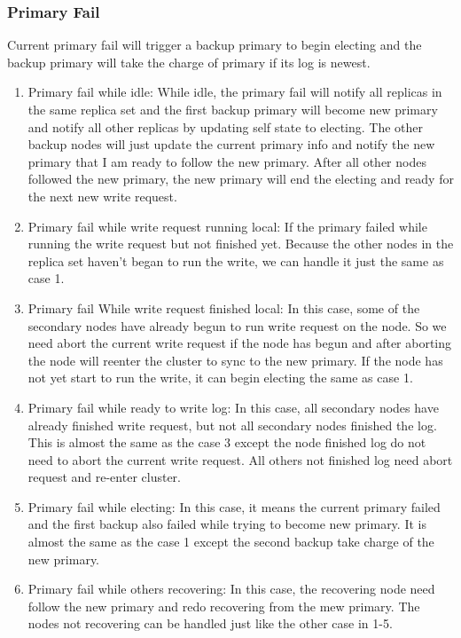 \subsubsection{Primary Fail}
Current primary fail will trigger a backup primary to begin electing and the backup primary will take the charge of primary if its log is newest.
\begin{enumerate}

\item Primary fail while idle: While idle, the primary fail will notify all replicas in the same replica set and the first backup primary will become new primary and notify all other replicas by updating self state to electing. The other backup nodes will just update the current primary info and notify the new primary that I am ready to follow the new primary. After all other nodes followed the new primary, the new primary will end the electing and ready for the next new write request.
\item Primary fail while write request running local: If the primary failed while running the write request but not finished yet. Because the other nodes in the replica set haven't began to run the write, we can handle it just the same as case 1.
\item Primary fail While write request finished local: In this case, some of the secondary nodes have already begun to run write request on the node. So we need abort the current write request if the node has begun and after aborting the node will reenter the cluster to sync to the new primary. If the node has not yet start to run the write, it can begin electing the same as case 1.
\item Primary fail while ready to write log: In this case, all secondary nodes have already finished write request, but not all secondary nodes finished the log. This is almost the same as the case 3 except the node finished log do not need to abort the current write request. All others not finished log need abort request and re-enter cluster.
\item Primary fail while electing: In this case, it means the current primary failed and the first backup also failed while trying to become new primary. It is almost the same as the case 1 except the second backup take charge of the new primary.
\item Primary fail while others recovering: In this case, the recovering node need follow the new primary and redo recovering from the mew primary. The nodes not recovering can be handled just like the other case in 1-5.
\end{enumerate}

